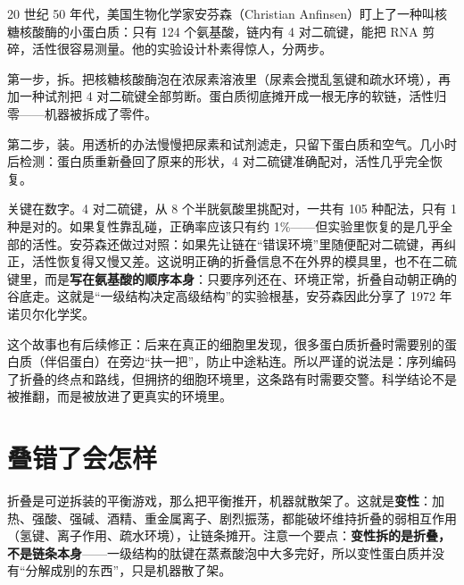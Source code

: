 \begin{zhengju}
20 世纪 50 年代，美国生物化学家安芬森（Christian Anfinsen）盯上了一种叫核糖核酸酶的小蛋白质：只有 124 个氨基酸，链内有 4 对二硫键，能把 RNA 剪碎，活性很容易测量。他的实验设计朴素得惊人，分两步。

第一步，拆。把核糖核酸酶泡在浓尿素溶液里（尿素会搅乱氢键和疏水环境），再加一种试剂把 4 对二硫键全部剪断。蛋白质彻底摊开成一根无序的软链，活性归零——机器被拆成了零件。

第二步，装。用透析的办法慢慢把尿素和试剂滤走，只留下蛋白质和空气。几小时后检测：蛋白质重新叠回了原来的形状，4 对二硫键准确配对，活性几乎完全恢复。

关键在数字。4 对二硫键，从 8 个半胱氨酸里挑配对，一共有 105 种配法，只有 1 种是对的。如果复性靠乱碰，正确率应该只有约 1\%——但实验里恢复的是几乎全部的活性。安芬森还做过对照：如果先让链在“错误环境”里随便配对二硫键，再纠正，活性恢复得又慢又差。这说明正确的折叠信息不在外界的模具里，也不在二硫键里，而是\textbf{写在氨基酸的顺序本身}：只要序列还在、环境正常，折叠自动朝正确的谷底走。这就是“一级结构决定高级结构”的实验根基，安芬森因此分享了 1972 年诺贝尔化学奖。

这个故事也有后续修正：后来在真正的细胞里发现，很多蛋白质折叠时需要别的蛋白质（伴侣蛋白）在旁边“扶一把”，防止中途粘连。所以严谨的说法是：序列编码了折叠的终点和路线，但拥挤的细胞环境里，这条路有时需要交警。科学结论不是被推翻，而是被放进了更真实的环境里。
\end{zhengju}

\section{叠错了会怎样}

折叠是可逆拆装的平衡游戏，那么把平衡推开，机器就散架了。这就是\textbf{变性}：加热、强酸、强碱、酒精、重金属离子、剧烈振荡，都能破坏维持折叠的弱相互作用（氢键、离子作用、疏水环境），让链条摊开。注意一个要点：\textbf{变性拆的是折叠，不是链条本身}——一级结构的肽键在蒸煮酸泡中大多完好，所以变性蛋白质并没有“分解成别的东西”，只是机器散了架。


